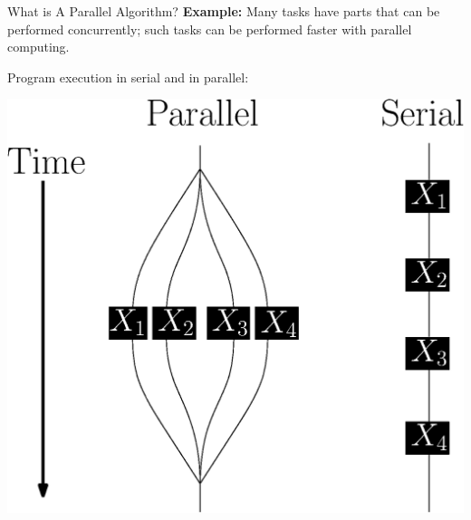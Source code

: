 \documentclass[table,serif,mathserif,final]{beamer}
\theoremstyle{remark}
\begin{document}
\begin{frame}{}
\begin{columns}[t]
\begin{column}{0.21\linewidth}
\begin{block}{\Huge What is A Parallel Algorithm?}
  \textbf{Example:} Many tasks have parts that can be performed concurrently; such tasks can be performed faster with parallel computing.

  {\color{blue} Program execution in serial and in parallel: }

  \centering
  \includegraphics[width=0.6\linewidth]{imgs/parallelForLoop/serialParallelComparison.eps}
\end{block}
\vspace{0.5cm}


\end{column}
\end{columns}
\end{frame}
\end{document}
